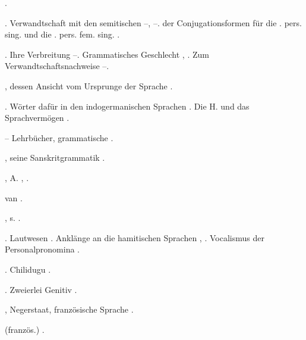 \begin{register}
 \pageref{sp.246}.

 \pageref{sp.142}. Verwandtschaft mit den semitischen \pageref{sp.160}–\pageref{sp.162}, \pageref{sp.281}–\pageref{sp.282}.   der Conjugationsformen für die \pageref{sp.2}. pers. sing. und die \pageref{sp.3}. pers. fem. sing. \pageref{sp.307}.

. Ihre Verbreitung \pageref{sp.142}–\pageref{sp.143}. Grammatisches Geschlecht \pageref{sp.160}, \pageref{sp.254}. Zum Verwandtschaftsnachweise \pageref{sp.160}–\pageref{sp.162}.

, dessen Ansicht vom Ursprunge der Sprache \pageref{sp.19}.

. Wörter dafür in den indogermanischen Sprachen \pageref{sp.153}. Die H. und das Sprachvermögen \pageref{sp.305}.

 – Lehrbücher, grammatische \pageref{sp.111}.

, seine Sanskritgrammatik \pageref{sp.26}.


, A. \pageref{sp.193}, \pageref{sp.411}.


van  \pageref{sp.444}.

, s. .

. Lautwesen \pageref{sp.34}. Anklänge an die hamitischen Sprachen \pageref{sp.161}, \pageref{sp.282}. Vocalismus der Personalpronomina \pageref{sp.408}.

. Chilidugu \pageref{sp.194}.

. Zweierlei Genitiv \pageref{sp.463}.

, Negerstaat, französische Sprache \sed{\pageref{sp.147},} \pageref{sp.293}.



 (französ.) \pageref{sp.360}.




\end{register}
